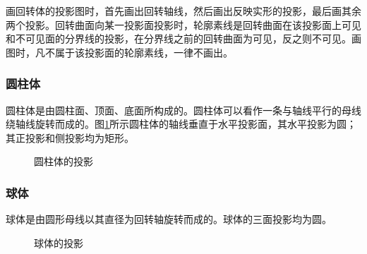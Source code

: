 画回转体的投影图时，首先画出回转轴线，然后画出反映实形的投影，最后画其余两个投影。回转曲面向某一投影面投影时，轮廓素线是回转曲面在该投影面上可见和不可见面的分界线的投影，在分界线之前的回转曲面为可见，反之则不可见。画图时，凡不属于该投影面的轮廓素线，一律不画出。
\subsubsection{圆柱体}
圆柱体是由圆柱面、顶面、底面所构成的。圆柱体可以看作一条与轴线平行的母线绕轴线旋转而成的。图\ref{fig:yuanzhutix}所示圆柱体的轴线垂直于水平投影面，其水平投影为圆；其正投影和侧投影均为矩形。
\begin{figure}[htbp]
\centering
{}\hspace{30pt}
\caption{圆柱体的投影}\label{fig:yuanzhutix}
\end{figure}

\subsubsection{球体}
球体是由圆形母线以其直径为回转轴旋转而成的。球体的三面投影均为圆。

\begin{figure}[tbp]
\centering
{}\hspace{30pt}
\caption{球体的投影}\label{fig:qiout}
\end{figure}

\endinput